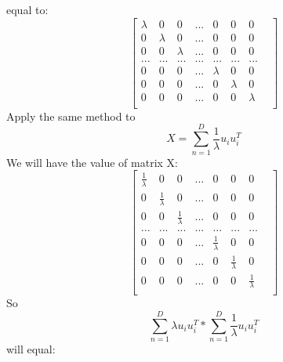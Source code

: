 \documentclass{article}
\begin{document}
        equal to:
        $$
            \begin{bmatrix}
                \lambda & 0 & 0 & ... & 0 & 0 & 0\\
                0 & \lambda & 0 & ... & 0 & 0 & 0\\
                0 & 0 & \lambda & ... & 0 & 0 & 0\\
                ...&...&...&...&...&...&...&\\
                0 & 0 & 0 & ... & \lambda & 0 & 0\\
                0 & 0 & 0 & ... & 0 & \lambda & 0\\
                0 & 0 & 0 & ... & 0 & 0 & \lambda\\
            \end{bmatrix}
        $$
        Apply the same method to
        $$
            X = \sum_{n=1}^{D} \frac{1}{\lambda} u_i u_i^T
        $$
        We will have the value of matrix X:
        $$
            \begin{bmatrix}
                \frac{1}{\lambda} & 0 & 0 & ... & 0 & 0 & 0\\
                0 & \frac{1}{\lambda} & 0 & ... & 0 & 0 & 0\\
                0 & 0 & \frac{1}{\lambda} & ... & 0 & 0 & 0\\
                ...&...&...&...&...&...&...&\\
                0 & 0 & 0 & ... & \frac{1}{\lambda} & 0 & 0\\
                0 & 0 & 0 & ... & 0 & \frac{1}{\lambda} & 0\\
                0 & 0 & 0 & ... & 0 & 0 & \frac{1}{\lambda}\\
            \end{bmatrix}
        $$
        So
        $$
            \sum_{n=1}^{D} \lambda u_i u_i^T * \sum_{n=1}^{D} \frac{1}{\lambda} u_i u_i^T
        $$
        will equal:
\end{document}
